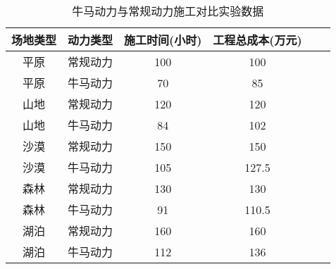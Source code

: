 \begin{table}[htbp]
    \centering
    \caption{牛马动力与常规动力施工对比实验数据}
    \label{tab:comparison}
    \begin{tabular}{cccccc}
        \toprule
        场地类型 & 动力类型 & 施工时间(小时) & 工程总成本(万元) \\
        \midrule
        平原   & 常规动力 & 100      & 100       \\
        平原   & 牛马动力 & 70       & 85        \\
        山地   & 常规动力 & 120      & 120       \\
        山地   & 牛马动力 & 84       & 102       \\
        沙漠   & 常规动力 & 150      & 150       \\
        沙漠   & 牛马动力 & 105      & 127.5     \\
        森林   & 常规动力 & 130      & 130       \\
        森林   & 牛马动力 & 91       & 110.5     \\
        湖泊   & 常规动力 & 160      & 160       \\
        湖泊   & 牛马动力 & 112      & 136       \\
        \bottomrule
    \end{tabular}
\end{table}